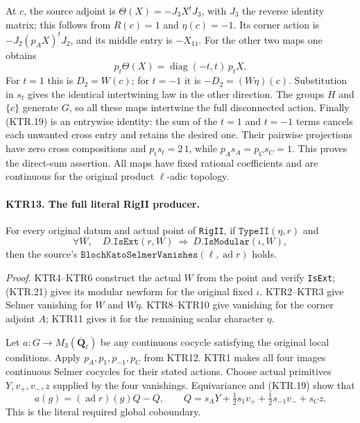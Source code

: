 At \(c\), the source adjoint is
\(\Theta(X)=-J_3X^tJ_3\), with \(J_3\) the reverse
identity matrix; this follows from \(R(c)=1\) and
\(\eta(c)=-1\).  Its corner action is
\(-J_2(p_AX)^tJ_2\), and its middle entry is \(-X_{11}\).
For the other two maps one obtains
\[
       p_t\Theta(X)=\operatorname{diag}(-t,t)\,p_tX.
 \tag{KTR.20}
\]
For \(t=1\) this is \(D_2=W(c)\); for \(t=-1\) it
is \(-D_2=(W\eta)(c)\).  Substitution in \(s_t\)
gives the identical intertwining law in the other direction.
The groups \(H\) and \(\{c\}\) generate \(G\), so
all these maps intertwine the full disconnected action.
Finally (KTR.19) is an entrywise identity: the sum of the
\(t=1\) and \(t=-1\) terms cancels each unwanted cross
entry and retains the desired one.  Their pairwise projections
have zero cross compositions and \(p_ts_t=2\,1\), while
\(p_As_A=p_Cs_C=1\).  This proves the direct-sum assertion.
All maps have fixed rational coefficients and are continuous
for the original product \(\ell\)-adic topology.

\paragraph{KTR13. The full literal RigII producer.}
\label{claim:KTR13}
For every original datum and actual point of \texttt{RigII},
if \(\texttt{TypeII}(\eta,r)\) and
\[
 \forall W,\quad D.\texttt{IsExt}(r,W)
                 \ \Longrightarrow\ D.\texttt{IsModular}(\iota,W),
 \tag{KTR.21}
\]
then the source's
\(\texttt{BlochKatoSelmerVanishes}(\ell,\operatorname{ad}r)\)
holds.

\emph{Proof.}
KTR4--KTR6 construct the actual \(W\) from the point and
verify \texttt{IsExt}; (KTR.21) gives its modular newform for
the original fixed \(\iota\).  KTR2--KTR3 give Selmer
vanishing for \(W\) and \(W\eta\).  KTR8--KTR10 give
vanishing for the corner adjoint \(A\); KTR11 gives it for
the remaining scalar character \(\eta\).

Let \(a:G\to M_3(\overline{\mathbf Q}_\ell)\) be any
continuous cocycle satisfying the original local conditions.
Apply \(p_A,p_1,p_{-1},p_C\) from KTR12.  KTR1 makes all
four images continuous Selmer cocycles for their stated actions.
Choose actual primitives \(Y,v_+,v_-,z\) supplied by the
four vanishings.  Equivariance and (KTR.19) show that
\[
 a(g)=(\operatorname{ad}r)(g)Q-Q,
 \qquad
 Q=s_A Y+\tfrac12s_1v_++\tfrac12s_{-1}v_-+s_Cz.
 \tag{KTR.22}
\]
This is the literal required global coboundary.

